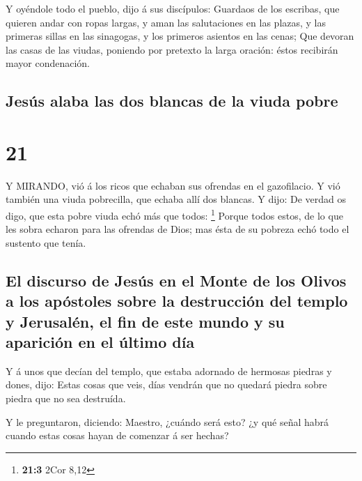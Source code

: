  Y oyéndole todo el pueblo, dijo á sus discípulos:
 Guardaos de los escribas, que quieren andar con ropas
largas, y aman las salutaciones en las plazas, y las primeras sillas en
las sinagogas, y los primeros asientos en las cenas;  Que
devoran las casas de las viudas, poniendo por pretexto la larga oración:
éstos recibirán mayor condenación.

\hypertarget{jesuxfas-alaba-las-dos-blancas-de-la-viuda-pobre}{%
\subsection{Jesús alaba las dos blancas de la viuda
pobre}\label{jesuxfas-alaba-las-dos-blancas-de-la-viuda-pobre}}

\hypertarget{section-20}{%
\section{21}\label{section-20}}

 Y MIRANDO, vió á los ricos que echaban sus ofrendas en el
gazofilacio.  Y vió también una viuda pobrecilla, que echaba
allí dos blancas.  Y dijo: De verdad os digo, que esta pobre
viuda echó más que todos: \footnote{\textbf{21:3} 2Cor 8,12}
 Porque todos estos, de lo que les sobra echaron para las
ofrendas de Dios; mas ésta de su pobreza echó todo el sustento que
tenía.

\hypertarget{el-discurso-de-jesuxfas-en-el-monte-de-los-olivos-a-los-apuxf3stoles-sobre-la-destrucciuxf3n-del-templo-y-jerusaluxe9n-el-fin-de-este-mundo-y-su-apariciuxf3n-en-el-uxfaltimo-duxeda}{%
\subsection{El discurso de Jesús en el Monte de los Olivos a los
apóstoles sobre la destrucción del templo y Jerusalén, el fin de este
mundo y su aparición en el último
día}\label{el-discurso-de-jesuxfas-en-el-monte-de-los-olivos-a-los-apuxf3stoles-sobre-la-destrucciuxf3n-del-templo-y-jerusaluxe9n-el-fin-de-este-mundo-y-su-apariciuxf3n-en-el-uxfaltimo-duxeda}}

 Y á unos que decían del templo, que estaba adornado de
hermosas piedras y dones, dijo:  Estas cosas que veis, días
vendrán que no quedará piedra sobre piedra que no sea destruída.

 Y le preguntaron, diciendo: Maestro, ¿cuándo será esto? ¿y
qué señal habrá cuando estas cosas hayan de comenzar á ser hechas?

